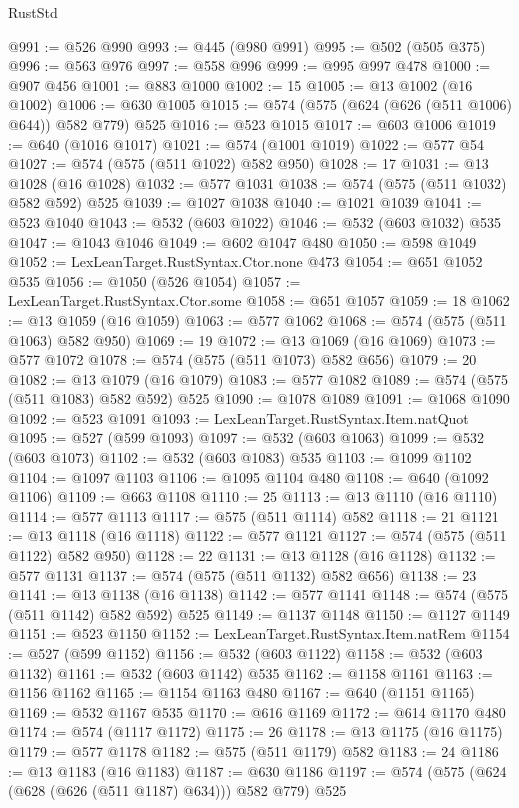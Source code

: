 \begin{lexlean}{RustStd}
\begin{coremodule}
@991 := @526 @990
@993 := @445 (@980 @991)
@995 := @502 (@505 @375)
@996 := @563 @976
@997 := @558 @996
@999 := @995 @997 @478
@1000 := @907 @456
@1001 := @883 @1000
@1002 := 15
@1005 := @13 @1002 (@16 @1002)
@1006 := @630 @1005
@1015 := @574 (@575 (@624 (@626 (@511 @1006) @644)) @582 @779) @525
@1016 := @523 @1015
@1017 := @603 @1006
@1019 := @640 (@1016 @1017)
@1021 := @574 (@1001 @1019)
@1022 := @577 @54
@1027 := @574 (@575 (@511 @1022) @582 @950)
@1028 := 17
@1031 := @13 @1028 (@16 @1028)
@1032 := @577 @1031
@1038 := @574 (@575 (@511 @1032) @582 @592) @525
@1039 := @1027 @1038
@1040 := @1021 @1039
@1041 := @523 @1040
@1043 := @532 (@603 @1022)
@1046 := @532 (@603 @1032) @535
@1047 := @1043 @1046
@1049 := @602 @1047 @480
@1050 := @598 @1049
@1052 := LexLeanTarget.RustSyntax.Ctor.none @473
@1054 := @651 @1052 @535
@1056 := @1050 (@526 @1054)
@1057 := LexLeanTarget.RustSyntax.Ctor.some
@1058 := @651 @1057
@1059 := 18
@1062 := @13 @1059 (@16 @1059)
@1063 := @577 @1062
@1068 := @574 (@575 (@511 @1063) @582 @950)
@1069 := 19
@1072 := @13 @1069 (@16 @1069)
@1073 := @577 @1072
@1078 := @574 (@575 (@511 @1073) @582 @656)
@1079 := 20
@1082 := @13 @1079 (@16 @1079)
@1083 := @577 @1082
@1089 := @574 (@575 (@511 @1083) @582 @592) @525
@1090 := @1078 @1089
@1091 := @1068 @1090
@1092 := @523 @1091
@1093 := LexLeanTarget.RustSyntax.Item.natQuot
@1095 := @527 (@599 @1093)
@1097 := @532 (@603 @1063)
@1099 := @532 (@603 @1073)
@1102 := @532 (@603 @1083) @535
@1103 := @1099 @1102
@1104 := @1097 @1103
@1106 := @1095 @1104 @480
@1108 := @640 (@1092 @1106)
@1109 := @663 @1108
@1110 := 25
@1113 := @13 @1110 (@16 @1110)
@1114 := @577 @1113
@1117 := @575 (@511 @1114) @582
@1118 := 21
@1121 := @13 @1118 (@16 @1118)
@1122 := @577 @1121
@1127 := @574 (@575 (@511 @1122) @582 @950)
@1128 := 22
@1131 := @13 @1128 (@16 @1128)
@1132 := @577 @1131
@1137 := @574 (@575 (@511 @1132) @582 @656)
@1138 := 23
@1141 := @13 @1138 (@16 @1138)
@1142 := @577 @1141
@1148 := @574 (@575 (@511 @1142) @582 @592) @525
@1149 := @1137 @1148
@1150 := @1127 @1149
@1151 := @523 @1150
@1152 := LexLeanTarget.RustSyntax.Item.natRem
@1154 := @527 (@599 @1152)
@1156 := @532 (@603 @1122)
@1158 := @532 (@603 @1132)
@1161 := @532 (@603 @1142) @535
@1162 := @1158 @1161
@1163 := @1156 @1162
@1165 := @1154 @1163 @480
@1167 := @640 (@1151 @1165)
@1169 := @532 @1167 @535
@1170 := @616 @1169
@1172 := @614 @1170 @480
@1174 := @574 (@1117 @1172)
@1175 := 26
@1178 := @13 @1175 (@16 @1175)
@1179 := @577 @1178
@1182 := @575 (@511 @1179) @582
@1183 := 24
@1186 := @13 @1183 (@16 @1183)
@1187 := @630 @1186
@1197 := @574 (@575 (@624 (@628 (@626 (@511 @1187) @634))) @582 @779) @525

\end{coremodule}
\end{lexlean}
